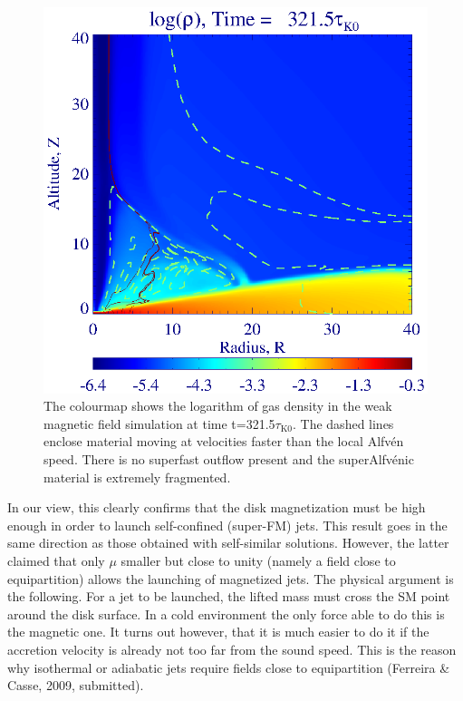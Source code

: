 \documentclass{aa}
\begin{document}
   \begin{figure}
   \centering \includegraphics[width=\columnwidth]{12633c16.eps}
   \caption{ The colourmap shows the logarithm of gas density in the weak magnetic field simulation at time t=321.5$\tau_\mathrm{K0}$.  The dashed lines enclose material moving at velocities faster than the
	local Alfv\'en speed.  There is no superfast outflow present and the superAlfv\'enic material is extremely fragmented.  }
              \label{weakB}%
    \end{figure}
In our view, this clearly confirms that the disk magnetization must be high enough in order to launch self-confined (super-FM) jets. This result goes in the same direction as those obtained with
self-similar solutions. However, the latter claimed that only $\mu$ smaller but close to unity (namely a field close to equipartition) allows the launching of magnetized jets. The physical argument is
the following. For a jet to be launched, the lifted mass must cross the SM point around the disk surface. In a cold environment the only force able to do this is the magnetic one. It turns out
however, that it is much easier to do it if the accretion velocity is already not too far from the sound speed. This is the reason why isothermal or adiabatic jets require fields close to
equipartition (Ferreira \& Casse, 2009, submitted).
\end{document}
